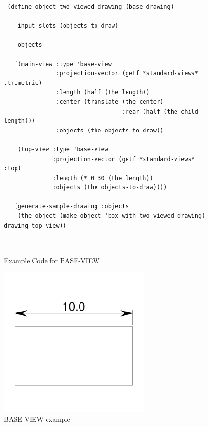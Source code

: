 \documentclass [11pt]{book}
\begin{document}
\begin{itemize}
\begin{figure}
\begin{lrbox}{\boxedverb}
\begin{minipage}{\linewidth}
{\begin{verbatim}
 (define-object two-viewed-drawing (base-drawing)
   
   :input-slots (objects-to-draw)
   
   :objects
  
   ((main-view :type 'base-view
               :projection-vector (getf *standard-views* :trimetric)
               :length (half (the length))
               :center (translate (the center)
                                  :rear (half (the-child length)))
               :objects (the objects-to-draw))
   
    (top-view :type 'base-view
              :projection-vector (getf *standard-views* :top)
              :length (* 0.30 (the length))
              :objects (the objects-to-draw))))

   (generate-sample-drawing :objects 
    (the-object (make-object 'box-with-two-viewed-drawing) drawing top-view))
 
 
\end{verbatim}}
\end{minipage}
\end{lrbox}
\fbox{\usebox{\boxedverb}}

\caption{Example Code for BASE-VIEW}

\label{fig:example-code-BASE-VIEW}

\end{figure}

\begin{figure}
\begin{center}
\includegraphics[width=3in,height=3in]{../images/example-base-view.pdf}
\end{center}

\caption{BASE-VIEW example}

\label{fig:BASE-VIEW}

\end{figure}






\end{itemize}
\end{document}
